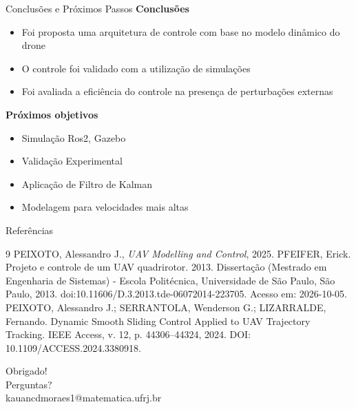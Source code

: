 \documentclass[aspectratio=169, 11pt]{beamer}
\begin{document}
  \begin{frame}{Conclusões e Próximos Passos}
    \textbf{Conclusões}
    \begin{itemize}
      \item Foi proposta uma arquitetura de controle com base no modelo dinâmico do drone
      \item O controle foi validado com a utilização de simulações
      \item Foi avaliada a eficiência do controle na presença de perturbações externas
    \end{itemize}
    \textbf{Próximos objetivos}
    \begin{itemize}
      \item Simulação Ros2, Gazebo     
      \item Validação Experimental     
      \item Aplicação de Filtro de Kalman     
      \item Modelagem para velocidades mais altas
    \end{itemize}
  \end{frame}

  \begin{frame}{Referências}
    \begin{thebibliography}{9}
        PEIXOTO, Alessandro J.,
        \emph{UAV Modelling and Control}, 2025.
      PFEIFER, Erick. Projeto e controle de um UAV quadrirotor. 2013. Dissertação (Mestrado em Engenharia de Sistemas) - Escola Politécnica, Universidade de São Paulo, São Paulo, 2013. doi:10.11606/D.3.2013.tde-06072014-223705. Acesso em: 2026-10-05.
      PEIXOTO, Alessandro J.; SERRANTOLA, Wenderson G.; LIZARRALDE, Fernando. Dynamic Smooth Sliding Control Applied to UAV Trajectory Tracking. IEEE Access, v. 12, p. 44306–44324, 2024. DOI: 10.1109/ACCESS.2024.3380918.

    \end{thebibliography}
    \end{frame} 
  
  \begin{frame}
    \vspace{1cm}
    \centering
      \Huge Obrigado!\\[0.5cm]
      \large Perguntas?\\
    \vspace{3cm}  
    \hspace{6.5cm}
    kauancdmoraes1@matematica.ufrj.br
    \end{frame}
\end{document}
